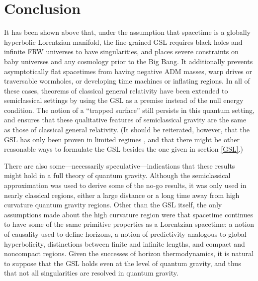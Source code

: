 \documentclass[12pt]{article}
\begin{document}
\section{Conclusion}

It has been shown above that, under the assumption that spacetime is a globally hyperbolic Lorentzian manifold, the fine-grained GSL requires black holes and infinite FRW universes to have singularities, and places severe constraints on baby universes and any cosmology prior to the Big Bang.  It additionally prevents asymptotically flat spacetimes from having negative ADM masses, warp drives or traversable wormholes, or developing time machines or inflating regions.  In all of these cases, theorems of classical general relativity have been extended to semiclassical settings by using the GSL as a premise instead of the null energy condition.  The notion of a ``trapped surface'' still persists in this quantum setting, and ensures that these qualitative features of semiclassical gravity are the same as those of classical general relativity.  (It should be reiterated, however, that the GSL has only been proven in limited regimes \cite{10proofs}, and that there might be other reasonable ways to formulate the GSL besides the one given in section \ref{GSL}.)

There are also some---necessarily speculative---indications that these results might hold in a full theory of quantum gravity.  Although the semiclassical approximation was used to derive some of the no-go results, it was only used in nearly classical regions, either a large distance or a long time away from high curvature quantum gravity regions.  Other than the GSL itself, the only assumptions made about the high curvature region were that spacetime continues to have some of the same primitive properties as a Lorentzian spacetime: a notion of causality used to define horizons, a notion of predictivity analogous to global hyperbolicity, distinctions between finite and infinite lengths, and compact and noncompact regions.  Given the successes of horizon thermodynamics, it is natural to suppose that the GSL holds even at the level of quantum gravity, and thus that not all singularities are resolved in quantum gravity.
\end{document}
